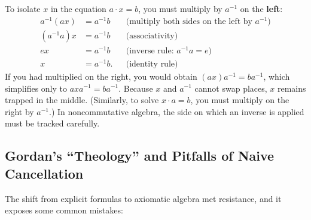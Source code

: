 To isolate $x$ in the equation $a \cdot x = b$, you must multiply by $a^{-1}$ on the \textbf{left}:
\begin{align*}
a^{-1}(ax) &= a^{-1}b && \text{(multiply both sides on the left by } a^{-1}\text{)}\\
(a^{-1}a)x &= a^{-1}b && \text{(associativity)}\\
ex &= a^{-1}b && \text{(inverse rule: } a^{-1}a = e\text{)}\\
x &= a^{-1}b. && \text{(identity rule)}
\end{align*}
If you had multiplied on the right, you would obtain $(ax)a^{-1} = ba^{-1}$, which simplifies only to $axa^{-1} = ba^{-1}$. Because $x$ and $a^{-1}$ cannot swap places, $x$ remains trapped in the middle. (Similarly, to solve $x \cdot a = b$, you must multiply on the right by $a^{-1}$.) In noncommutative algebra, the side on which an inverse is applied must be tracked carefully.

\subsection{Gordan's ``Theology'' and Pitfalls of Naive Cancellation}

The shift from explicit formulas to axiomatic algebra met resistance, and it exposes some common mistakes:

